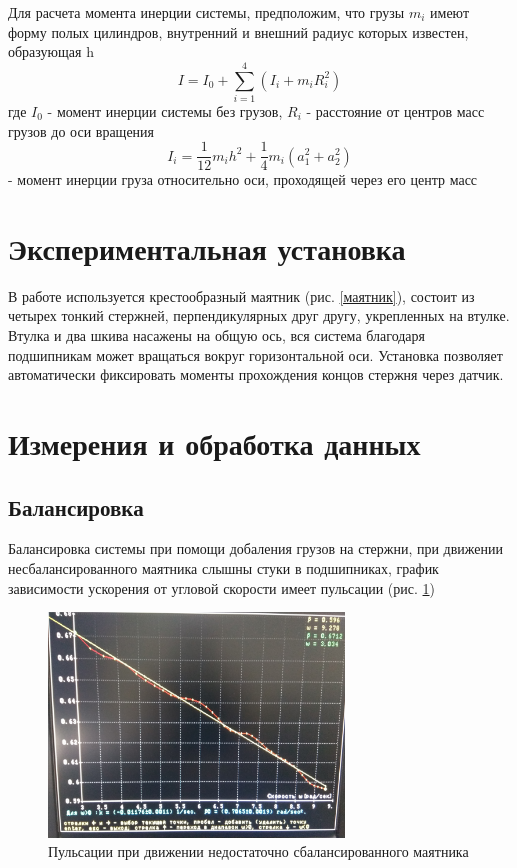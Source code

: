\documentclass[a4paper,12pt]{article} %
\begin{document}
Для расчета момента инерции системы, предположим, что грузы $m_i$ имеют форму полых цилиндров, внутренний и внешний радиус которых известен, образующая h
\begin{equation}
I = I_0 + \sum_{i=1}^4(I_i+m_iR_i^2)
\label{I}
\end{equation}
где $I_0$ - момент инерции системы без грузов, $R_i$ -  расстояние от центров масс грузов до оси вращения
\begin{equation}
I_i = \frac{1}{12}m_ih^2+\frac{1}{4}m_i(a_1^2+a_2^2)
\label{Ii}
\end{equation} - момент инерции груза относительно оси, проходящей через его центр масс
\section{Экспериментальная установка}
В работе используется крестообразный маятник (рис. \ref{маятник}), состоит из четырех тонкий стержней, перпендикулярных друг другу, укрепленных на втулке. Втулка и два шкива насажены на общую ось, вся система благодаря подшипникам может вращаться вокруг горизонтальной оси. Установка позволяет автоматически фиксировать моменты прохождения концов стержня через датчик.

\section{Измерения и обработка данных}
\subsection{Балансировка}
Балансировка системы при помощи добаления грузов на стержни, при движении несбалансированного маятника слышны стуки в подшипниках, график зависимости ускорения от угловой скорости имеет пульсации (рис. \ref{пульсации})
\begin{figure}[h!]
\begin{center}
\includegraphics[width=0.7\textwidth]{Пульсации}
\end{center}
\caption{Пульсации при движении недостаточно сбалансированного маятника} \label{пульсации}
\end{figure}
\end{document}
